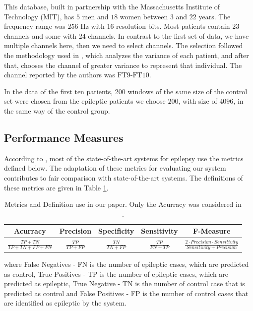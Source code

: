 This database, built in partnership with the Massachusetts Institute of Technology (MIT), has $5$ men and $18$ women between $3$ and $22$ years. The frequency range was $256$ Hz with $16$ resolution bits. Most patients contain $ 23 $ channels and some with $24$ channels. In contrast to the first set of data, we have multiple channels here, then we need to select channels. The selection followed the methodology used in \cite{shoeb2009application}, which analyzes the variance of each patient, and after that, chooses the channel of greater variance to represent that individual. The channel reported by the authors was $\text{FT9-FT10}$.

In the data of the first ten patients, 200 windows of the same size of the control set were chosen from the epileptic patients we choose $200$, with size of $4096$, in the same way of the control group.


\subsection{Performance Measures}

According to \cite{roy2019deep}, most of the state-of-the-art systems for epilepsy use the metrics defined below. The adaptation of these metrics for evaluating our system contributes to fair comparison with state-of-the-art systems. The definitions of these metrics are given in Table \ref{table:metrics}.

\begin{table}[!ht]
\centering
\begin{tabular}{ccccc}
\hline
 \textbf{Acurracy} & \textbf{Precision} & \textbf{Specificity} & \textbf{Sensitivity} & \textbf{F-Measure} \\ \hline
 $\frac{TP+TN}{TP+TN+FP+FN}$ & $\frac{TP}{TP+FP}$ & $\frac{TN}{TN+FP}$ & $\frac{TP}{FN+TP}$ & $\frac{2\cdot Precision \cdot Sensitivity}{Sensitivity+Precision}$\\ \hline
\end{tabular}
\caption{Metrics and Definition use in our paper. Only the Acurracy was considered in \cite{WenZha:2018}.}
\label{table:metrics}
\end{table}

\noindent where False Negatives - FN is the number of epileptic cases, which are predicted as control, True Positives - TP is the number of epileptic cases, which are predicted as epileptic, True Negative - TN is the number of control case that is predicted as control and False Positives - FP is the number of control cases that are identified as epileptic by the system. 

